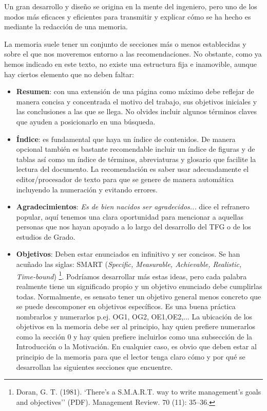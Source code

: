 {Un gran desarrollo y diseño se origina en la mente del ingeniero, pero uno de los modos más eficaces y eficientes para transmitir y explicar cómo se ha hecho es mediante la redacción de una memoria. 

La memoria suele tener un conjunto de secciones más o menos establecidas y sobre el que nos moveremos entorno a las recomendaciones. No obstante, como ya hemos indicado en este texto, no existe una estructura fija e inamovible, aunque hay ciertos elemento que no deben faltar:

\begin{itemize}
    \item \textbf{Resumen}: con una extensión de una página como máximo debe reflejar de manera concisa y concentrada el motivo del trabajo, sus objetivos iniciales y las conclusiones a las que se llega. No olvides incluir algunos términos claves que ayuden a posicionarlo en una búsqueda.
    \item \textbf{Índice}: es fundamental que haya un índice de contenidos. De manera opcional también es bastante recomendable incluir un índice de figuras y de tablas así como un índice de términos, abreviaturas y glosario que facilite la lectura del documento. La recomendación es saber usar adecuadamente el editor/procesador de texto para que se genere de manera automática incluyendo la numeración y evitando errores.
    \item \textbf{Agradecimientos}: {\it Es de bien nacidos ser agradecidos...} dice el refranero popular, aquí tenemos una clara oportunidad para mencionar a aquellas personas que nos hayan apoyado a lo largo del desarrollo del TFG o de los estudios de Grado. 
    \item \textbf{Objetivos}: Deben estar enunciados en infinitivo y ser concisos. Se han acuñado las siglas: SMART (\textit{Specific, Measurable, Achievable, Realistic, Time-bound}) \footnote{Doran, G. T. (1981). `There's a S.M.A.R.T. way to write management's goals and objectives'' (PDF). Management Review. 70 (11): 35–36.}. Podríamos desarrollar más estas ideas, pero cada palabra realmente tiene un significado propio y un objetivo enunciado debe cumplirlas todas. Normalmente, es sensato tener un objetivo general menos concreto que se puede descomponer en objetivos específicos. Es una buena práctica nombrarlos y numerarlos p.ej. OG1, OG2, OE1,OE2,... La ubicación de los objetivos en la memoria debe ser al principio, hay quien prefiere numerarlos como la sección 0 y hay quien prefiere incluirlos como una subsección de la Introducción o la Motivación. En cualquier caso, es obvio que deben estar al principio de la memoria para que el lector tenga claro cómo y por qué se desarrollan las siguientes secciones que encuentre.


\end{itemize}}
